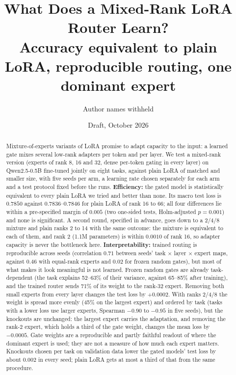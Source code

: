 \documentclass[11pt]{article}
\title{What Does a Mixed-Rank LoRA Router Learn?\\
\large Accuracy equivalent to plain LoRA, reproducible routing, one dominant expert}
\author{Author names withheld}
\date{Draft, October 2026}
\begin{document}
\maketitle

\begin{abstract}
Mixture-of-experts variants of LoRA promise to adapt capacity to the input: a learned gate
mixes several low-rank adapters per token and per layer. We test a mixed-rank version (experts of
rank 8, 16 and 32, dense per-token gating in every layer) on Qwen2.5-0.5B fine-tuned jointly on
eight tasks, against plain LoRA of matched and smaller size, with five seeds per arm, a learning
rate chosen separately for each arm and a test protocol fixed before the runs.
\textbf{Efficiency:} the gated model is statistically equivalent to every plain LoRA we tried and
better than none. Its macro test loss is $0.7850$ against $0.7836$--$0.7846$ for plain LoRA of
rank 16 to 66; all four differences lie within a pre-specified margin of $0.005$ (two one-sided
tests, Holm-adjusted $p=0.001$) and none is significant. A second round, specified in advance,
goes down to a 2/4/8 mixture and plain ranks 2 to 14 with the same outcome: the mixture is
equivalent to each of them, and rank 2 (1.1M parameters) is within $0.0010$ of rank 16, so
adapter capacity is never the bottleneck here.
\textbf{Interpretability:} trained routing is reproducible across seeds (correlation $0.71$
between seeds' task $\times$ layer $\times$ expert maps, against $0.46$ with equal-rank experts
and $0.02$ for frozen random gates), but most of what makes it look meaningful is not learned.
Frozen random gates are already task-dependent (the task explains 52--63\% of their variance,
against 65--85\% after training), and the trained router sends 71\% of its weight to the rank-32
expert. Removing both small experts from every layer changes the test loss by $+0.0002$. With
ranks 2/4/8 the weight is spread more evenly (45\% on the largest expert) and ordered by task
(tasks with a lower loss use larger experts, Spearman $-0.90$ to $-0.95$ in five seeds), but the
knockouts are unchanged: the largest expert carries the adaptation, and removing the rank-2
expert, which holds a third of the gate weight, changes the mean loss by $-0.0005$. Gate weights
are a reproducible and partly faithful readout of where the dominant expert is used; they are
not a measure of how much each expert matters. Knockouts chosen per task on validation data
lower the gated models' test loss by about $0.002$ in every seed; plain LoRA gets at most a
third of that from the same procedure.
\end{abstract}
\end{document}
